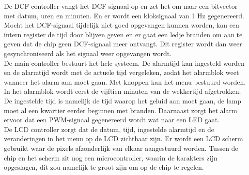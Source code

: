 \noindent De DCF controller vangt het DCF signaal op en zet het om naar een bitvector met datum, uren en minuten. En er wordt een kloksignaal van 1 Hz gegenereerd. Mocht het DCF-signaal tijdelijk niet goed opgevangen kunnen worden, kan een intern register de tijd door blijven geven en er gaat een ledje branden om aan te geven dat de chip geen DCF-signaal meer ontvangt. Dit register wordt dan weer gesynchroniseerd als het signaal weer opgevangen wordt.\\
De main controller bestuurt het hele systeem. De alarmtijd kan ingesteld worden en de alarmtijd wordt met de actuele tijd vergeleken, zodat het alarmblok weet wanneer het alarm aan moet gaan. Met knoppen kan het menu bestuurd worden.\\
In het alarmblok wordt eerst de vijftien minuten van de wekkertijd afgetrokken. De ingestelde tijd is namelijk de tijd waarop het geluid aan moet gaan, de lamp moet al een kwartier eerder beginnen met branden. Daarnaast zorgt het alarm ervoor dat een PWM-signaal gegenereerd wordt wat naar een LED gaat. \\
De LCD controller zorgt dat de datum, tijd, ingestelde alarmtijd en de veranderingen in het menu op de LCD zichtbaar zijn. Er wordt een LCD scherm gebruikt waar de pixels afzonderlijk van elkaar aangestuurd worden. Tussen de chip en het scherm zit nog een microcontroller, waarin de karakters zijn opgeslagen, dit zou namelijk te groot zijn om op de chip te regelen.
